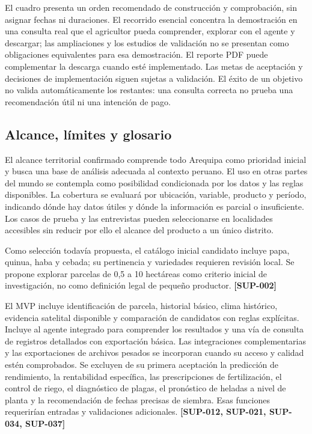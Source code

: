 \documentclass[10pt,a4paper]{article}
\begin{document}
El cuadro presenta un orden recomendado de construcción y comprobación, sin asignar fechas ni duraciones. El recorrido esencial concentra la demostración en una consulta real que el agricultor pueda comprender, explorar con el agente y descargar; las ampliaciones y los estudios de validación no se presentan como obligaciones equivalentes para esa demostración. El reporte PDF puede complementar la descarga cuando esté implementado. Las metas de aceptación y decisiones de implementación siguen sujetas a validación. El éxito de un objetivo no valida automáticamente los restantes: una consulta correcta no prueba una recomendación útil ni una intención de pago.


\subsection{Alcance, límites y glosario}

El alcance territorial confirmado comprende todo Arequipa como prioridad inicial y busca una base de análisis adecuada al contexto peruano. El uso en otras partes del mundo se contempla como posibilidad condicionada por los datos y las reglas disponibles. La cobertura se evaluará por ubicación, variable, producto y período, indicando dónde hay datos útiles y dónde la información es parcial o insuficiente. Los casos de prueba y las entrevistas pueden seleccionarse en localidades accesibles sin reducir por ello el alcance del producto a un único distrito.


Como selección todavía propuesta, el catálogo inicial candidato incluye papa, quinua, haba y cebada; su pertinencia y variedades requieren revisión local. Se propone explorar parcelas de 0,5 a 10 hectáreas como criterio inicial de investigación, no como definición legal de pequeño productor. \textbf{[SUP-002]}


El MVP incluye identificación de parcela, historial básico, clima histórico, evidencia satelital disponible y comparación de candidatos con reglas explícitas. Incluye al agente integrado para comprender los resultados y una vía de consulta de registros detallados con exportación básica. Las integraciones complementarias y las exportaciones de archivos pesados se incorporan cuando su acceso y calidad estén comprobados. Se excluyen de su primera aceptación la predicción de rendimiento, la rentabilidad específica, las prescripciones de fertilización, el control de riego, el diagnóstico de plagas, el pronóstico de heladas a nivel de planta y la recomendación de fechas precisas de siembra. Esas funciones requerirían entradas y validaciones adicionales. \textbf{[SUP-012, SUP-021, SUP-034, SUP-037]}
\end{document}

